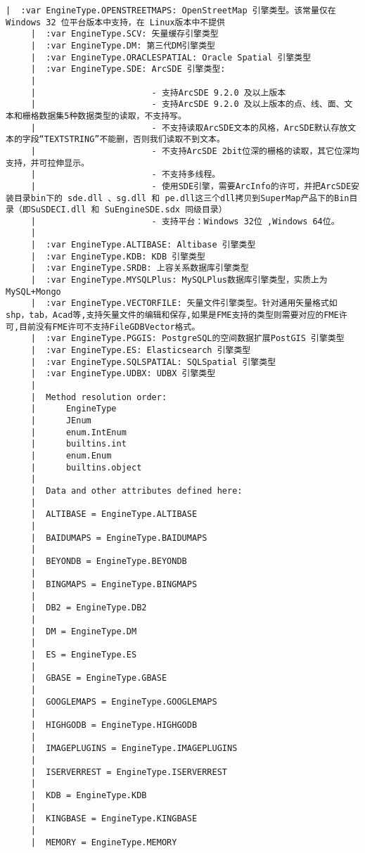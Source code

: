 \documentclass[11pt]{article}
\begin{document}
\begin{Verbatim}[commandchars=\\\{\}]
     |  :var EngineType.OPENSTREETMAPS: OpenStreetMap 引擎类型。该常量仅在 Windows 32 位平台版本中支持，在 Linux版本中不提供
     |  :var EngineType.SCV: 矢量缓存引擎类型
     |  :var EngineType.DM: 第三代DM引擎类型
     |  :var EngineType.ORACLESPATIAL: Oracle Spatial 引擎类型
     |  :var EngineType.SDE: ArcSDE 引擎类型:
     |  
     |                       - 支持ArcSDE 9.2.0 及以上版本
     |                       - 支持ArcSDE 9.2.0 及以上版本的点、线、面、文本和栅格数据集5种数据类型的读取，不支持写。
     |                       - 不支持读取ArcSDE文本的风格，ArcSDE默认存放文本的字段“TEXTSTRING”不能删，否则我们读取不到文本。
     |                       - 不支持ArcSDE 2bit位深的栅格的读取，其它位深均支持，并可拉伸显示。
     |                       - 不支持多线程。
     |                       - 使用SDE引擎，需要ArcInfo的许可，并把ArcSDE安装目录bin下的 sde.dll 、sg.dll 和 pe.dll这三个dll拷贝到SuperMap产品下的Bin目录（即SuSDECI.dll 和 SuEngineSDE.sdx 同级目录）
     |                       - 支持平台：Windows 32位 ,Windows 64位。
     |  
     |  :var EngineType.ALTIBASE: Altibase 引擎类型
     |  :var EngineType.KDB: KDB 引擎类型
     |  :var EngineType.SRDB: 上容关系数据库引擎类型
     |  :var EngineType.MYSQLPlus: MySQLPlus数据库引擎类型，实质上为MySQL+Mongo
     |  :var EngineType.VECTORFILE: 矢量文件引擎类型。针对通用矢量格式如 shp，tab，Acad等,支持矢量文件的编辑和保存,如果是FME支持的类型则需要对应的FME许可,目前没有FME许可不支持FileGDBVector格式。
     |  :var EngineType.PGGIS: PostgreSQL的空间数据扩展PostGIS 引擎类型
     |  :var EngineType.ES: Elasticsearch 引擎类型
     |  :var EngineType.SQLSPATIAL: SQLSpatial 引擎类型
     |  :var EngineType.UDBX: UDBX 引擎类型
     |  
     |  Method resolution order:
     |      EngineType
     |      JEnum
     |      enum.IntEnum
     |      builtins.int
     |      enum.Enum
     |      builtins.object
     |  
     |  Data and other attributes defined here:
     |  
     |  ALTIBASE = EngineType.ALTIBASE
     |  
     |  BAIDUMAPS = EngineType.BAIDUMAPS
     |  
     |  BEYONDB = EngineType.BEYONDB
     |  
     |  BINGMAPS = EngineType.BINGMAPS
     |  
     |  DB2 = EngineType.DB2
     |  
     |  DM = EngineType.DM
     |  
     |  ES = EngineType.ES
     |  
     |  GBASE = EngineType.GBASE
     |  
     |  GOOGLEMAPS = EngineType.GOOGLEMAPS
     |  
     |  HIGHGODB = EngineType.HIGHGODB
     |  
     |  IMAGEPLUGINS = EngineType.IMAGEPLUGINS
     |  
     |  ISERVERREST = EngineType.ISERVERREST
     |  
     |  KDB = EngineType.KDB
     |  
     |  KINGBASE = EngineType.KINGBASE
     |  
     |  MEMORY = EngineType.MEMORY

\end{Verbatim}
\end{document}
